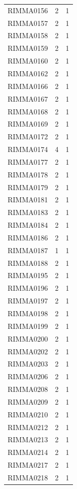 \documentclass[11pt]{article}
\begin{document}
\begin{linenumbers}
\begin{flushleft}
\begin{table}[htbp]
\begin{tabular}{ccc}
    RIMMA0156 & 2     & 1 \\
    RIMMA0157 & 2     & 1 \\
    RIMMA0158 & 2     & 1 \\
    RIMMA0159 & 2     & 1 \\
    RIMMA0160 & 2     & 1 \\
    RIMMA0162 & 2     & 1 \\
    RIMMA0166 & 2     & 1 \\
    RIMMA0167 & 2     & 1 \\
    RIMMA0168 & 2     & 1 \\
    RIMMA0169 & 2     & 1 \\
    RIMMA0172 & 2     & 1 \\
    RIMMA0174 & 4     & 1 \\
    RIMMA0177 & 2     & 1 \\
    RIMMA0178 & 2     & 1 \\
    RIMMA0179 & 2     & 1 \\
    RIMMA0181 & 2     & 1 \\
    RIMMA0183 & 2     & 1 \\
    RIMMA0184 & 2     & 1 \\
    RIMMA0186 & 2     & 1 \\
    RIMMA0187 & 1     & 1 \\
    RIMMA0188 & 2     & 1 \\
    RIMMA0195 & 2     & 1 \\
    RIMMA0196 & 2     & 1 \\
    RIMMA0197 & 2     & 1 \\
    RIMMA0198 & 2     & 1 \\
    RIMMA0199 & 2     & 1 \\
    RIMMA0200 & 2     & 1 \\
    RIMMA0202 & 2     & 1 \\
    RIMMA0203 & 2     & 1 \\
    RIMMA0206 & 2     & 1 \\
    RIMMA0208 & 2     & 1 \\
    RIMMA0209 & 2     & 1 \\
    RIMMA0210 & 2     & 1 \\
    RIMMA0212 & 2     & 1 \\
    RIMMA0213 & 2     & 1 \\
    RIMMA0214 & 2     & 1 \\
    RIMMA0217 & 2     & 1 \\
    RIMMA0218 & 2     & 1 \\

\end{tabular}
\end{table}
\end{flushleft}
\end{linenumbers}
\end{document}
